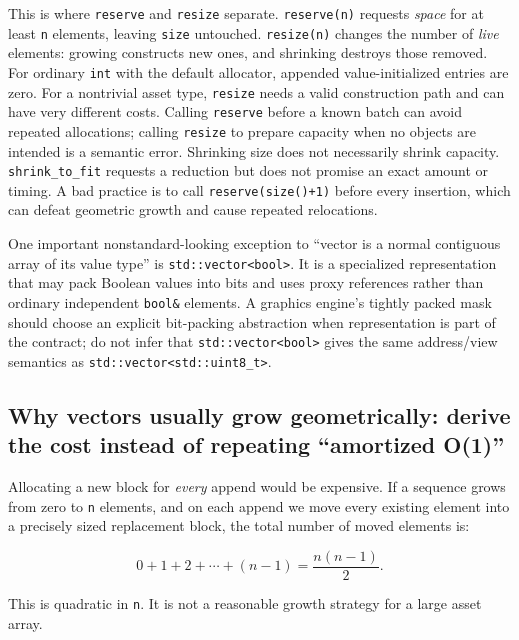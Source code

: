 This is where \texttt{reserve} and \texttt{resize} separate. \texttt{reserve(n)} requests \emph{space} for at least \texttt{n} elements, leaving \texttt{size} untouched. \texttt{resize(n)} changes the number of \emph{live} elements: growing constructs new ones, and shrinking destroys those removed. For ordinary \texttt{int} with the default allocator, appended value-initialized entries are zero. For a nontrivial asset type, \texttt{resize} needs a valid construction path and can have very different costs. Calling \texttt{reserve} before a known batch can avoid repeated allocations; calling \texttt{resize} to prepare capacity when no objects are intended is a semantic error. Shrinking size does not necessarily shrink capacity. \texttt{shrink\_to\_fit} requests a reduction but does not promise an exact amount or timing. A bad practice is to call \texttt{reserve(size()+1)} before every insertion, which can defeat geometric growth and cause repeated relocations.

One important nonstandard-looking exception to ``vector is a normal contiguous array of its value type'' is \texttt{std::vector\textless{}bool\textgreater{}}. It is a specialized representation that may pack Boolean values into bits and uses proxy references rather than ordinary independent \texttt{bool\&} elements. A graphics engine's tightly packed mask should choose an explicit bit-packing abstraction when representation is part of the contract; do not infer that \texttt{std::vector\textless{}bool\textgreater{}} gives the same address/view semantics as \texttt{std::vector\textless{}std::uint8\_t\textgreater{}}.

\subsection{Why vectors usually grow geometrically: derive the cost instead of repeating ``amortized O(1)''}\label{05-engine-i-ch005-why-vectors-usually-grow-geometrically-derive-the-cost-instead-of-repeating-amortized-o1}

Allocating a new block for \emph{every} append would be expensive. If a sequence grows from zero to \texttt{n} elements, and on each append we move every existing element into a precisely sized replacement block, the total number of moved elements is:

\[
0+1+2+\cdots+(n-1)=\frac{n(n-1)}{2}.
\]

This is quadratic in \texttt{n}. It is not a reasonable growth strategy for a large asset array.

